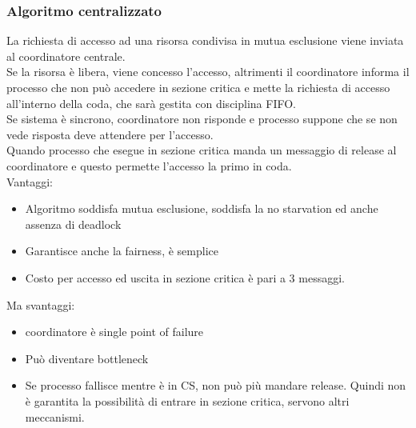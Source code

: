 \documentclass{article}
\begin{document}
\subsubsection{Algoritmo centralizzato}
La richiesta di accesso ad una risorsa condivisa in mutua esclusione viene inviata al coordinatore centrale.\\ Se la risorsa è libera, viene concesso l'accesso, altrimenti il coordinatore informa il processo che non può accedere in sezione critica e mette la richiesta di accesso all'interno della coda, che sarà gestita con disciplina FIFO.\\ Se sistema è sincrono, coordinatore non risponde e processo suppone che se non vede risposta deve attendere per l'accesso.\\ Quando processo che esegue in sezione critica manda un messaggio di release al coordinatore e questo permette l'accesso la primo in coda.\\ Vantaggi:
\begin{itemize}
\item Algoritmo soddisfa mutua esclusione, soddisfa la no starvation ed anche assenza di deadlock
\item  Garantisce anche la fairness, è semplice 
\item Costo per accesso ed uscita in sezione critica è pari a 3 messaggi. 
\end{itemize}
Ma svantaggi: 
\begin{itemize}
\item coordinatore è single point of failure
\item Può diventare bottleneck
\item Se processo fallisce mentre è in CS, non può più mandare release. Quindi non è garantita la possibilità di entrare in sezione critica, servono altri meccanismi.
\end{itemize}
\end{document}
